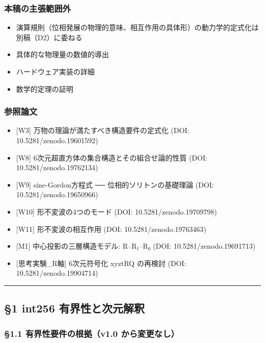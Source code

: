 \documentclass[a4paper,11pt]{ltjsarticle}
\providecommand{\tightlist}{\setlength{\itemsep}{0pt}\setlength{\parskip}{0pt}}
\begin{document}
\subsubsection{本稿の主張範囲外}\label{ux672cux7a3fux306eux4e3bux5f35ux7bc4ux56f2ux5916}

\begin{itemize}
\tightlist
\item
  演算規則（位相発展の物理的意味、相互作用の具体形）の動力学的定式化は別稿（D2）に委ねる
\item
  具体的な物理量の数値的導出
\item
  ハードウェア実装の詳細
\item
  数学的定理の証明
\end{itemize}

\subsubsection{参照論文}\label{ux53c2ux7167ux8ad6ux6587}

\begin{itemize}
\tightlist
\item
  {[}W3{]} 万物の理論が満たすべき構造要件の定式化 (DOI:
  10.5281/zenodo.19601592)
\item
  {[}W8{]} 6次元超直方体の集合構造とその組合せ論的性質 (DOI:
  10.5281/zenodo.19762134)
\item
  {[}W9{]} sine-Gordon方程式 ── 位相的ソリトンの基礎理論 (DOI:
  10.5281/zenodo.19650966)
\item
  {[}W10{]} 形不変波の4つのモード (DOI: 10.5281/zenodo.19709798)
\item
  {[}W11{]} 形不変波の相互作用 (DOI: 10.5281/zenodo.19763463)
\item
  {[}M1{]} 中心投影の三層構造モデル: R--R₁--R₀ (DOI:
  10.5281/zenodo.19691713)
\item
  {[}思考実験\_R軸{]} 6次元符号化 xyztRQ の再検討 (DOI:
  10.5281/zenodo.19904714)
\end{itemize}

\begin{center}\rule{0.5\linewidth}{0.5pt}\end{center}

\subsection{§1 int256
有界性と次元解釈}\label{int256-ux6709ux754cux6027ux3068ux6b21ux5143ux89e3ux91c8}

\subsubsection{§1.1 有界性要件の根拠（v1.0
から変更なし）}\label{ux6709ux754cux6027ux8981ux4ef6ux306eux6839ux62e0v1.0-ux304bux3089ux5909ux66f4ux306aux3057}
\end{document}
